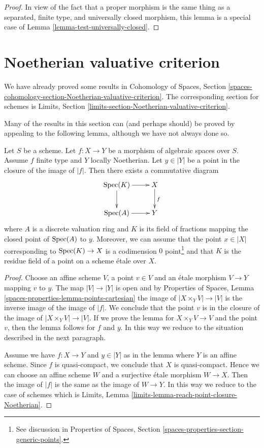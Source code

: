 \begin{proof}
In view of the fact that a proper morphism is the same thing as
a separated, finite type, and universally closed morphism, this
lemma is a special case of Lemma \ref{lemma-test-universally-closed}.
\end{proof}


\section{Noetherian valuative criterion}
\label{section-Noetherian-valuative-criterion}

\noindent
We have already proved some results in Cohomology of Spaces, Section
\ref{spaces-cohomology-section-Noetherian-valuative-criterion}.
The corresponding section for schemes is
Limits, Section \ref{limits-section-Noetherian-valuative-criterion}.

\medskip\noindent
Many of the results in this section can (and perhaps should)
be proved by appealing to the following lemma, although we have not
always done so.

\begin{lemma}
\label{lemma-reach-point-closure-Noetherian}
Let $S$ be a scheme. Let $f : X \to Y$ be a morphism of algebraic spaces
over $S$. Assume $f$ finite type and $Y$ locally Noetherian.
Let $y \in |Y|$ be a point in the closure of the image of $|f|$.
Then there exists a commutative diagram
$$
\xymatrix{
\Spec(K) \ar[r] \ar[d] & X \ar[d]^f \\
\Spec(A) \ar[r] & Y
}
$$
where $A$ is a discrete valuation ring and $K$ is its field of fractions
mapping the closed point of $\mathop{\mathrm{Spec}}(A)$ to $y$. Moreover, we can assume
that the point $x \in |X|$ corresponding to $\mathop{\mathrm{Spec}}(K) \to X$ is a
codimension $0$ point\footnote{See discussion in
Properties of Spaces, Section \ref{spaces-properties-section-generic-points}.}
and that $K$ is the residue field of a point
on a scheme \'etale over $X$.
\end{lemma}

\begin{proof}
Choose an affine scheme $V$, a point $v \in V$ and an \'etale morphism
$V \to Y$ mapping $v$ to $y$. The map $|V| \to |Y|$ is open and by
Properties of Spaces, Lemma \ref{spaces-properties-lemma-points-cartesian}
the image of $|X \times_Y V| \to |V|$ is the inverse image of the
image of $|f|$. We conclude that the point $v$ is in the closure of the
image of $|X \times_Y V| \to |V|$. If we prove the lemma for
$X \times_Y V \to V$ and the point $v$, then the lemma follows for
$f$ and $y$. In this way we reduce to the situation described in the
next paragraph.

\medskip\noindent
Assume we have $f : X \to Y$ and $y \in |Y|$ as in the lemma where
$Y$ is an affine scheme. Since $f$ is quasi-compact, we conclude that
$X$ is quasi-compact. Hence we can choose an affine scheme $W$ and
a surjective \'etale morphism $W \to X$. Then the image of
$|f|$ is the same as the image of $W \to Y$. In this way we reduce
to the case of schemes which is
Limits, Lemma \ref{limits-lemma-reach-point-closure-Noetherian}.
\end{proof}

